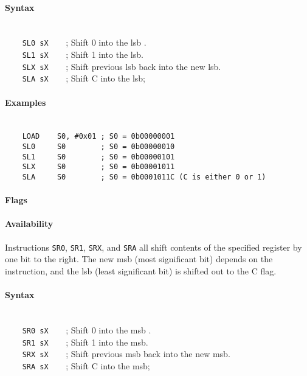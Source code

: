        \paragraph{Syntax}
            ~\\
            \verb'    SL0 sX    '; Shift 0 into the lsb .\\
            \verb'    SL1 sX    '; Shift 1 into the lsb.\\
            \verb'    SLX sX    '; Shift previous lsb back into the new lsb.\\
            \verb'    SLA sX    '; Shift C into the lsb;

        \paragraph{Examples}
            ~\\
            \verb'    LOAD    S0, #0x01 ; S0 = 0b00000001'\\
            \verb'    SL0     S0        ; S0 = 0b00000010'\\
            \verb'    SL1     S0        ; S0 = 0b00000101'\\
            \verb'    SLX     S0        ; S0 = 0b00001011'\\
            \verb'    SLA     S0        ; S0 = 0b0001011C (C is either 0 or 1)'

        \paragraph{Flags}

        \paragraph{Availability}
            \pbavailability{\yes}{\yes}{\yes}{\yes}{\yes}

    \clearpage
        Instructions \texttt{SR0}, \texttt{SR1}, \texttt{SRX}, and \texttt{SRA} all shift contents of the specified register by one bit to the right. The new msb (most significant bit) depends on the instruction, and the lsb (least significant bit) is shifted out to the C flag.

        \paragraph{Syntax}
            ~\\
            \verb'    SR0 sX    '; Shift 0 into the msb .\\
            \verb'    SR1 sX    '; Shift 1 into the msb.\\
            \verb'    SRX sX    '; Shift previous msb back into the new msb.\\
            \verb'    SRA sX    '; Shift C into the msb;

